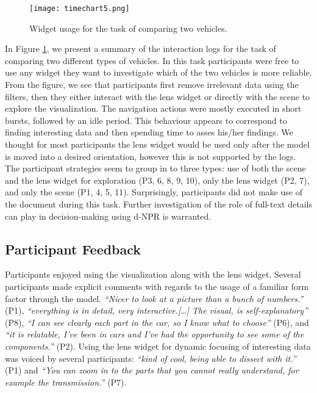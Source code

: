 	\begin{figure}
	 \centering  
	 \texttt{[image: timechart5.png]}  
	 \caption{Widget usage for the task of comparing two vehicles.}
	 \label{figure:timechart}
	\end{figure}

In Figure \ref{figure:timechart}, we present a summary of the interaction logs
for the task of comparing two different types of vehicles. In this task
participants were free to use any widget they want to investigate which of the
two vehicles is more reliable. From the figure, we see that participants first
remove irrelevant data using the filters, then they either interact with 
the lens widget or directly with the \threed scene to explore the visualization.
The navigation actions were mostly executed in short bursts, followed by an idle
period. This behaviour appears to correspond to finding interesting data and
then spending time to asses his/her findings. We thought for most participants
the lens widget would be used only after the \threed model is moved into a
desired orientation, however this is not supported by the logs. The participant
strategies seem to group in to three types: use of both the \threed scene and
the lens widget for exploration (P3, 6, 8, 9, 10), only the lens widget (P2, 7),
and only the \threed scene (P1, 4, 5, 11). Surprisingly, participants did not
make use of the document during this task. Further investigation of the role of
full-text details can play in decision-making using d-NPR is warranted.


 
\subsection{Participant Feedback}
Participants enjoyed using the \threed visualization along with the lens widget.
Several participants made explicit comments with regards to the usage of a
familiar form factor through the \threed model. \emph{``Nicer to look at a
picture than a bunch of numbers.''} (P1), \emph{``everything is in detail, very
interactive.[\ldots] The visual, is self-explanatory''} (P8), \emph{``I can see
clearly each part in the car, so I know what to choose''} (P6), and \emph{``it is
relatable, I've been in cars and I've had the opportunity to see some of the
components.''} (P2). Using the lens widget for dynamic focusing of interesting
data was voiced by several participants: \emph{``kind of cool, being able to
dissect with it.''} (P1) and \emph{``You can zoom in to the parts that you
cannot really understand, for example the transmission.''} (P7).

